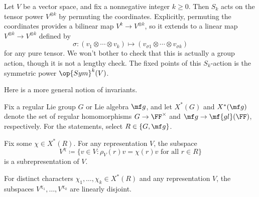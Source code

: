 \documentclass[../notes.tex]{subfiles}
\begin{document}
\begin{example}
	Let $V$ be a vector space, and fix a nonnegative integer $k\ge0$. Then $S_k$ acts on the tensor power $V^{\otimes k}$ by permuting the coordinates. Explicitly, permuting the coordinates provides a bilinear map $V^k\to V^{\otimes k}$, so it extends to a linear map $V^{\otimes k}\to V^{\otimes k}$ defined by
	\[\sigma\colon (v_1\otimes\cdots\otimes v_k)\mapsto(v_{\sigma1}\otimes\cdots\otimes v_{\sigma k})\]
	for any pure tensor. We won't bother to check that this is actually a group action, though it is not a lengthy check. The fixed points of this $S_k$-action is the symmetric power $\op{Sym}^k(V)$.
\end{example}
Here is a more general notion of invariants.
\begin{lemma} \label{lem:weight-decomposition}
	Fix a regular Lie group $G$ or Lie algebra $\mf g$, and let $X^*(G)$ and $X^*(\mf g)$ denote the set of regular homomorphisms $G\to\FF^\times$ and $\mf g\to\mf{gl}(\FF)$, respectively. For the statements, select $R\in\{G,\mf g\}$.
	\begin{listalph}
		\item Fix some $\chi\in X^*(R)$. For any representation $V$, the subspace
		\[V^\chi\coloneqq\{v\in V:\rho_V(r)v=\chi(r)v\text{ for all }r\in R\}\]
		is a subrepresentation of $V$.
		\item For distinct characters $\chi_1,\ldots,\chi_k\in X^*(R)$ and any representation $V$, the subspaces $V^{\chi_1},\ldots,V^{\chi_k}$ are linearly disjoint.
	\end{listalph}
\end{lemma}
\end{document}
